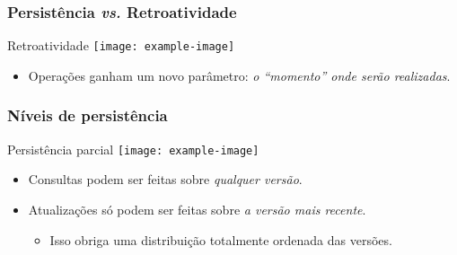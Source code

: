 \documentclass[brazil]{beamer}
\begin{document}
    \begin{frame}
        \frametitle{Persistência {\em vs.} Retroatividade}
        
        \begin{block}{Retroatividade}
            \centering
            \texttt{[image: example-image]}
        \end{block}
        
        \begin{itemize}
            \item Operações ganham um novo parâmetro: {\em o ``momento'' onde serão realizadas}.
        \end{itemize}

    \end{frame}


    \begin{frame}
        \frametitle{Níveis de persistência}

        \begin{block}{Persistência parcial}
            \centering
            \texttt{[image: example-image]}
        \end{block}

        \begin{itemize}
            \item<1-> Consultas podem ser feitas sobre {\em qualquer versão}.
            \item<2-> Atualizações só podem ser feitas sobre {\em a versão mais recente}.
            \begin{itemize}
                \item<3-> Isso obriga uma distribuição totalmente ordenada das versões.
            \end{itemize}
        \end{itemize}

    \end{frame}
\end{document}
